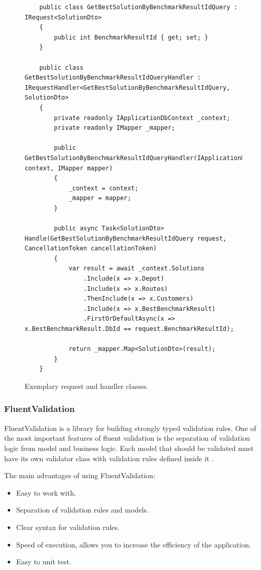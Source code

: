 \documentclass[a4paper,twoside,12pt]{book}
\begin{document}
\begin{figure}
\centering
\begin{lstlisting}
    public class GetBestSolutionByBenchmarkResultIdQuery : IRequest<SolutionDto>
    {
        public int BenchmarkResultId { get; set; }
    }

    public class GetBestSolutionByBenchmarkResultIdQueryHandler : IRequestHandler<GetBestSolutionByBenchmarkResultIdQuery, SolutionDto>
    {
        private readonly IApplicationDbContext _context;
        private readonly IMapper _mapper;

        public GetBestSolutionByBenchmarkResultIdQueryHandler(IApplicationDbContext context, IMapper mapper)
        {
            _context = context;
            _mapper = mapper;
        }

        public async Task<SolutionDto> Handle(GetBestSolutionByBenchmarkResultIdQuery request, CancellationToken cancellationToken)
        {
            var result = await _context.Solutions
                .Include(x => x.Depot)
                .Include(x => x.Routes)
                .ThenInclude(x => x.Customers)
                .Include(x => x.BestBenchmarkResult)
                .FirstOrDefaultAsync(x => x.BestBenchmarkResult.DbId == request.BenchmarkResultId);

            return _mapper.Map<SolutionDto>(result);
        }
    }
\end{lstlisting}
\caption{Exemplary request and handler classes.}
\label{fig:mediatR}
\end{figure}


\subsubsection{FluentValidation}
FluentValidation is a library for building strongly typed validation rules. One of the most important features of fluent validation is the separation of validation logic from model and business logic. Each model that should be validated must have its own validator class with validation rules defined inside it \cite{bib:fluentValidation}. 

The main advantages of using FluentValidation:
\begin{itemize}
\item Easy to work with.
\item Separation of validation rules and models.
\item Clear syntax for validation rules.
\item Speed of execution, allows you to increase the efficiency of the application.
\item Easy to unit test.
\end{itemize}
\end{document}

